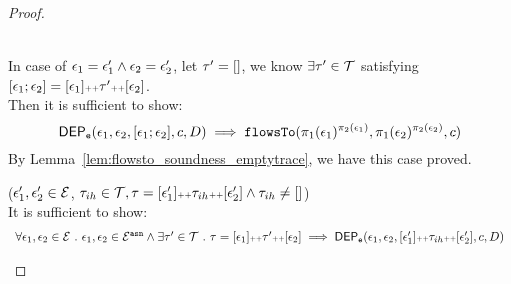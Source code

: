 \begin{proof}
\begin{case}
      \\
      In case of $\mathtt{\epsilon}_1 = \mathtt{\epsilon}_1' \land  \mathtt{\epsilon}_2 = \mathtt{\epsilon}_2'$,
      let $\mathtt{\tau}' = []$, we know $\exists \mathtt{\tau}' \in \mathcal{T}$ satisfying 
      $[\mathtt{\epsilon}_1; \mathtt{\epsilon}_2] = [\mathtt{\epsilon}_1] {\scriptscriptstyle ++} \mathtt{\tau}' {\scriptscriptstyle ++} [\mathtt{\epsilon}_2]$.
      \\
      Then it is sufficient to show: 
      \[
        \mathsf{DEP_{\mathtt{e}}}(\mathtt{\epsilon}_1, \mathtt{\epsilon}_2, [\mathtt{\epsilon}_1; \mathtt{\epsilon}_2], c, D) 
        \implies \mathtt{flowsTo}(\pi_1(\mathtt{\epsilon}_1)^{\pi_2(\mathtt{\epsilon}_1)}, \pi_1(\mathtt{\epsilon}_2)^{\pi_2(\mathtt{\epsilon}_2)}, c)
      \]
     By Lemma~\ref{lem:flowsto_soundness_emptytrace}, we have this case proved.
      \end{case}
        \begin{case}
        ($\mathtt{\epsilon}_1', \mathtt{\epsilon}_2' \in \mathcal{E}$, $\mathtt{\tau}_{ih} \in \mathcal{T}, \mathtt{\tau} = [\mathtt{\epsilon}_1'] {\scriptscriptstyle ++} \mathtt{\tau}_{ih} {\scriptscriptstyle ++} [\mathtt{\epsilon}_2'] \land \mathtt{\tau}_{ih} \neq {[]}$)
        \\
        It is sufficient to show:
        \[    \begin{array}{l}
         \forall \mathtt{\epsilon}_1, \mathtt{\epsilon}_2 \in \mathcal{E}  ~.~
          \mathtt{\epsilon}_1, \mathtt{\epsilon}_2 \in \mathcal{E}^{\mathtt{{asn}}} \land 
           \exists \mathtt{\tau}' \in \mathcal{T}  ~.~ \mathtt{\tau} = [\mathtt{\epsilon}_1] {\scriptscriptstyle ++} \mathtt{\tau}' {\scriptscriptstyle ++} [\mathtt{\epsilon}_2]
          \implies
          \mathsf{DEP_{\mathtt{e}}}(\mathtt{\epsilon}_1, \mathtt{\epsilon}_2, [\mathtt{\epsilon}_1'] {\scriptscriptstyle ++} \mathtt{\tau}_{ih} {\scriptscriptstyle ++} [\mathtt{\epsilon}_2'], c, D) 

\end{array}\]
\end{case}
\end{proof}
